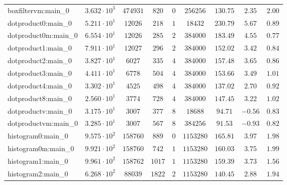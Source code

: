 \begin{tabular}{|l|c|c|c|c|c|c|c|c|}
boxfiltervm:main\_0            & $ 3.632 \cdot 10^{3} $ & $ 474931   $ & $ 820    $ & $ 0    $ & $ 256256   $ & $ 130.75      $ & $ 2.35    $ & $ 2.00    $ \\
dotproduct0:main\_0            & $ 5.211 \cdot 10^{1} $ & $ 12026    $ & $ 218    $ & $ 1    $ & $ 18432    $ & $ 230.79      $ & $ 5.67    $ & $ 0.89    $ \\
dotproduct0m:main\_0           & $ 6.554 \cdot 10^{1} $ & $ 12026    $ & $ 285    $ & $ 2    $ & $ 384000   $ & $ 183.49      $ & $ 4.55    $ & $ 0.77    $ \\
dotproduct1:main\_0            & $ 7.911 \cdot 10^{1} $ & $ 12027    $ & $ 296    $ & $ 2    $ & $ 384000   $ & $ 152.02      $ & $ 3.42    $ & $ 0.84    $ \\
dotproduct2:main\_0            & $ 3.827 \cdot 10^{1} $ & $ 6027     $ & $ 335    $ & $ 4    $ & $ 384000   $ & $ 157.48      $ & $ 3.65    $ & $ 0.86    $ \\
dotproduct3:main\_0            & $ 4.411 \cdot 10^{1} $ & $ 6778     $ & $ 504    $ & $ 4    $ & $ 384000   $ & $ 153.66      $ & $ 3.49    $ & $ 1.01    $ \\
dotproduct4:main\_0            & $ 3.302 \cdot 10^{1} $ & $ 4525     $ & $ 498    $ & $ 4    $ & $ 384000   $ & $ 137.02      $ & $ 2.70    $ & $ 0.92    $ \\
dotproduct8:main\_0            & $ 2.560 \cdot 10^{1} $ & $ 3774     $ & $ 728    $ & $ 4    $ & $ 384000   $ & $ 147.45      $ & $ 3.22    $ & $ 1.02    $ \\
dotproductv:main\_0            & $ 3.175 \cdot 10^{1} $ & $ 3007     $ & $ 377    $ & $ 8    $ & $ 18688    $ & $ 94.71       $ & $ -0.56   $ & $ 0.83    $ \\
dotproductvm:main\_0           & $ 3.285 \cdot 10^{1} $ & $ 3007     $ & $ 567    $ & $ 8    $ & $ 384256   $ & $ 91.53       $ & $ -0.93   $ & $ 0.82    $ \\
histogram0:main\_0             & $ 9.575 \cdot 10^{2} $ & $ 158760   $ & $ 889    $ & $ 0    $ & $ 1153280  $ & $ 165.81      $ & $ 3.97    $ & $ 1.98    $ \\
histogram0m:main\_0            & $ 9.921 \cdot 10^{2} $ & $ 158760   $ & $ 742    $ & $ 1    $ & $ 1153280  $ & $ 160.03      $ & $ 3.75    $ & $ 1.99    $ \\
histogram1:main\_0             & $ 9.961 \cdot 10^{2} $ & $ 158762   $ & $ 1017   $ & $ 1    $ & $ 1153280  $ & $ 159.39      $ & $ 3.73    $ & $ 1.56    $ \\
histogram2:main\_0             & $ 6.268 \cdot 10^{2} $ & $ 88039    $ & $ 1822   $ & $ 2    $ & $ 1153280  $ & $ 140.45      $ & $ 2.88    $ & $ 1.94    $ \\

\end{tabular}
